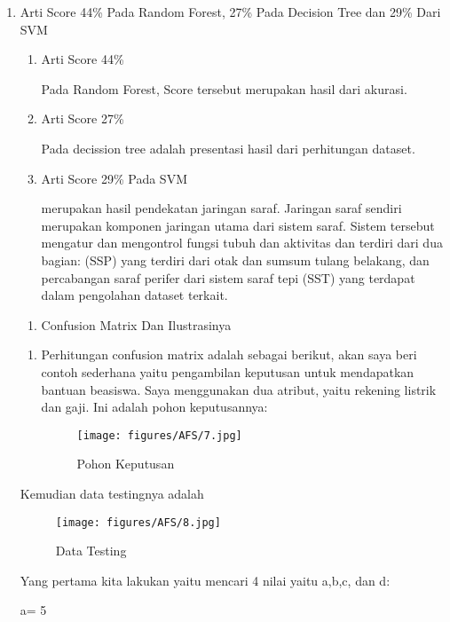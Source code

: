 \begin{enumerate}
\item Arti Score 44\% Pada Random Forest, 27\% Pada Decision Tree dan 29\% Dari SVM \par
	\begin{enumerate}
	\item Arti Score 44\% \par Pada Random Forest, Score tersebut merupakan hasil dari akurasi.
	\item Arti Score 27\% \par Pada decission tree adalah presentasi hasil dari perhitungan dataset.
	\item Arti Score 29\% Pada SVM \par merupakan hasil pendekatan jaringan saraf. Jaringan saraf sendiri merupakan komponen jaringan utama dari sistem saraf. Sistem tersebut mengatur dan mengontrol fungsi tubuh dan aktivitas dan terdiri dari dua bagian:  (SSP) yang terdiri dari otak dan sumsum tulang belakang, dan percabangan saraf perifer dari sistem saraf tepi (SST) yang terdapat dalam pengolahan dataset terkait. 
	\end{enumerate}

\begin {enumerate}
\item Confusion Matrix Dan Ilustrasinya
\end{enumerate}

\begin{enumerate}
\item Perhitungan confusion matrix adalah sebagai berikut, akan saya beri contoh sederhana yaitu pengambilan keputusan untuk mendapatkan bantuan beasiswa. Saya menggunakan dua atribut, yaitu rekening listrik dan gaji. Ini adalah pohon keputusannya:
 
\begin{figure}[ht]
\centering
\texttt{[image: figures/AFS/7.jpg]}
\caption{Pohon Keputusan}
\label{contoh}
\end{figure}

\end{enumerate}


Kemudian data testingnya adalah

\begin{figure}[ht]
\centering
\texttt{[image: figures/AFS/8.jpg]}
\caption{Data Testing}
\label{contoh}
\end{figure}

Yang pertama kita lakukan yaitu mencari 4 nilai yaitu a,b,c, dan d:

 a= 5


\end{enumerate}
